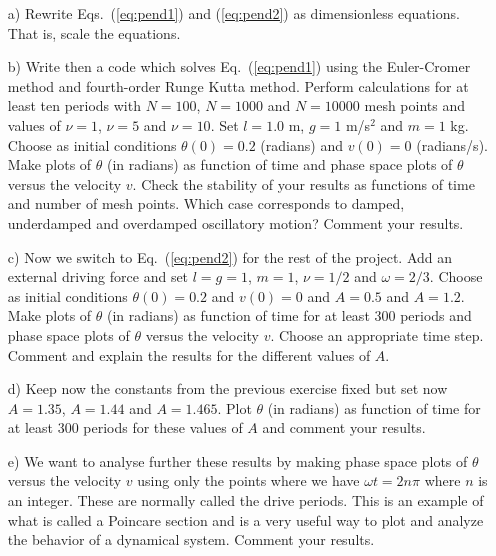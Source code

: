 \begin{enumerate}
\item[a)] Rewrite Eqs.~(\ref{eq:pend1}) and (\ref{eq:pend2}) as dimensionless equations. That is, scale the equations.

\item [b)] Write then a code which solves  Eq.~(\ref{eq:pend1}) using the Euler-Cromer method and fourth-order
Runge Kutta method. Perform calculations for at least ten  periods with $N=100$, $N=1000$ and $N=10000$ mesh points
and values of $\nu = 1$, $\nu = 5$ and $\nu =10$.  
Set $l=1.0$ m, $g=1$ m/s$^2$ and $m=1$ kg.  
Choose as initial conditions $\theta(0) = 0.2$ (radians) and $v(0) = 0$ (radians/s). 
Make plots of $\theta$ (in radians) as function of time
and phase space plots of
$\theta$ versus the velocity $v$.
Check the stability of your results as functions of time and number of mesh points. 
Which case corresponds to damped, underdamped and overdamped oscillatory motion?  Comment your results.
\item[c)] Now we switch to Eq.~(\ref{eq:pend2}) for the rest of the project. Add an external driving force and 
set $l=g=1$, $m=1$, $\nu = 1/2$ and $\omega = 2/3$.  
Choose as initial conditions $\theta(0) = 0.2$ and $v(0) = 0$ and $A=0.5$ and $A=1.2$.
Make plots of $\theta$ (in radians) as function of time for at least 300 periods and phase space plots of
$\theta$ versus the velocity $v$. Choose an appropriate time step. Comment and explain the results for the different values of $A$.
\item[d)]  Keep now the constants from the previous exercise fixed but set now $A=1.35$, $A=1.44$ and 
$A=1.465$. Plot $\theta$ (in radians) as function of time for at least 300 periods for these values of $A$ and 
comment your results. 
\item[e)] We want to analyse further these results by making phase space plots of
$\theta$ versus the velocity $v$ using only the points where we have $\omega t=2n\pi$ where $n$ is an integer. These are normally
called the drive periods.
This is an example of what is called a Poincare section and is a very useful way to plot and analyze the behavior of a dynamical
system. Comment your results.
\end{enumerate}







